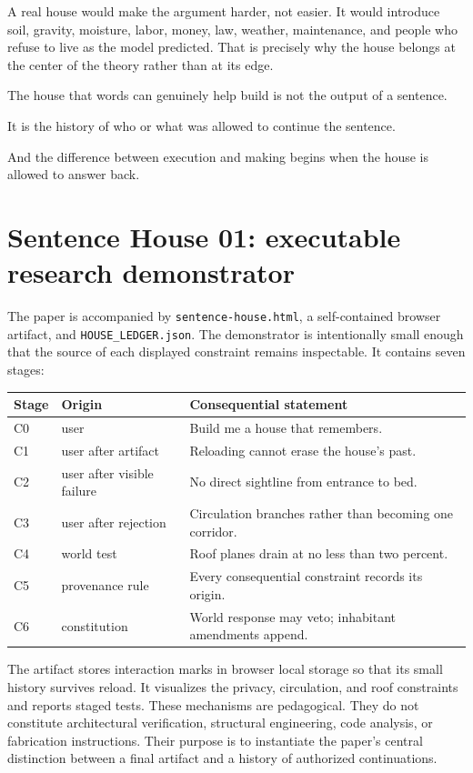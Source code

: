 \documentclass[11pt]{article}
\begin{document}
A real house would make the argument harder, not easier. It would introduce soil, gravity, moisture, labor, money, law, weather, maintenance, and people who refuse to live as the model predicted. That is precisely why the house belongs at the center of the theory rather than at its edge.

The house that words can genuinely help build is not the output of a sentence.

It is the history of who or what was allowed to continue the sentence.

And the difference between execution and making begins when the house is allowed to answer back.

\appendix
\section{Sentence House 01: executable research demonstrator}

The paper is accompanied by \nolinkurl{sentence-house.html}, a self-contained browser artifact, and \nolinkurl{HOUSE_LEDGER.json}. The demonstrator is intentionally small enough that the source of each displayed constraint remains inspectable. It contains seven stages:

\begin{center}
\begin{tabular}{lll}
\toprule
Stage & Origin & Consequential statement \\
\midrule
C0 & user & Build me a house that remembers. \\
C1 & user after artifact & Reloading cannot erase the house's past. \\
C2 & user after visible failure & No direct sightline from entrance to bed. \\
C3 & user after rejection & Circulation branches rather than becoming one corridor. \\
C4 & world test & Roof planes drain at no less than two percent. \\
C5 & provenance rule & Every consequential constraint records its origin. \\
C6 & constitution & World response may veto; inhabitant amendments append. \\
\bottomrule
\end{tabular}
\end{center}

The artifact stores interaction marks in browser local storage so that its small history survives reload. It visualizes the privacy, circulation, and roof constraints and reports staged tests. These mechanisms are pedagogical. They do not constitute architectural verification, structural engineering, code analysis, or fabrication instructions. Their purpose is to instantiate the paper's central distinction between a final artifact and a history of authorized continuations.
\end{document}
